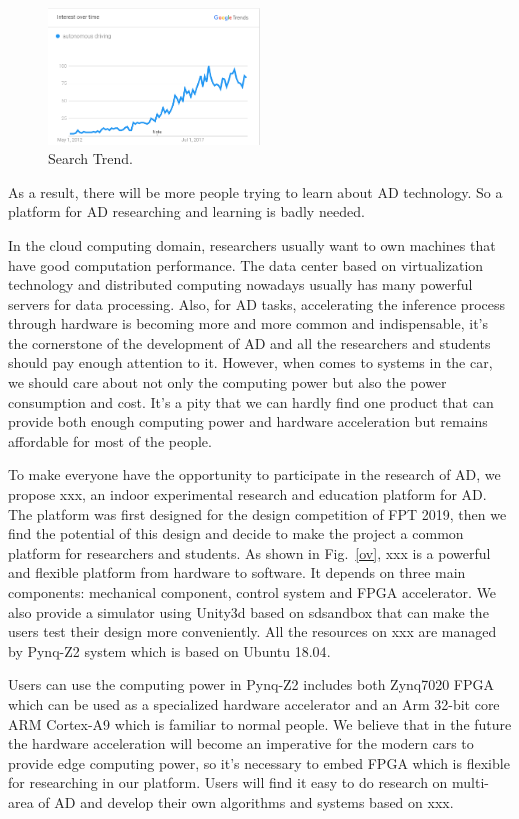 \documentclass[conference]{IEEEtran}
\begin{document}
\begin{sloppypar}
\begin{figure}[htbp]
\centerline{\includegraphics[width=0.5\textwidth]{search_result.PNG}}
\caption{Search Trend.}
\label{st}
\end{figure}

As a result, there will be more people trying to learn about AD technology. So a platform for AD researching and learning is badly needed. 

In the cloud computing domain, researchers usually want to own machines that have good computation performance. The data center based on virtualization technology\cite{b2} and distributed computing\cite{b3} nowadays usually has many powerful servers for data processing. Also, for AD tasks, accelerating the inference process through hardware is becoming more and more common and indispensable, it's the cornerstone of the development of AD and all the researchers and students should pay enough attention to it. However, when comes to systems in the car, we should care about not only the computing power but also the power consumption and cost. It's a pity that we can hardly find one product that can provide both enough computing power and hardware acceleration but remains affordable for most of the people.

To make everyone have the opportunity to participate in the research of AD, we propose xxx, an indoor experimental research and education platform for AD. The platform was first designed for the design competition of FPT 2019\cite{b39}, then we find the potential of this design and decide to make the project a common platform for researchers and students. As shown in Fig.~\ref{ov}, xxx is a powerful and flexible platform from hardware to software. It depends on three main components: mechanical component, control system and FPGA accelerator. We also provide a simulator using Unity3d\cite{b4} based on sdsandbox\cite{b5} that can make the users test their design more conveniently. All the resources on xxx are managed by Pynq-Z2\cite{b6} system which is based on Ubuntu 18.04\cite{b7}. 

Users can use the computing power in Pynq-Z2 includes both Zynq7020 FPGA\cite{b40} which can be used as a specialized hardware accelerator and an Arm 32-bit core ARM Cortex-A9\cite{b8} which is familiar to normal people. We believe that in the future the hardware acceleration will become an imperative for the modern cars to provide edge computing power, so it's necessary to embed FPGA which is flexible for researching in our platform. Users will find it easy to do research on multi-area of AD and develop their own algorithms and systems based on xxx.


\end{sloppypar}
\end{document}
